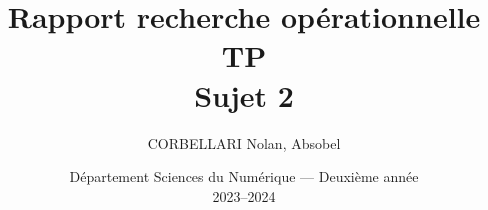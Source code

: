 \documentclass[12pt]{article}
\begin{document}
\title{\vspace{4cm} \textbf{Rapport recherche opérationnelle TP \\ Sujet 2}}
\author{CORBELLARI Nolan, Absobel}
\date{\vspace{7cm} Département Sciences du Numérique --- Deuxième année \\
    2023--2024}

\maketitle

\newpage
\pagebreak
\vfill

\newpage
\tableofcontents
\newpage

 \newpage
 \newpage
 \newpage
 \newpage
\end{document}
